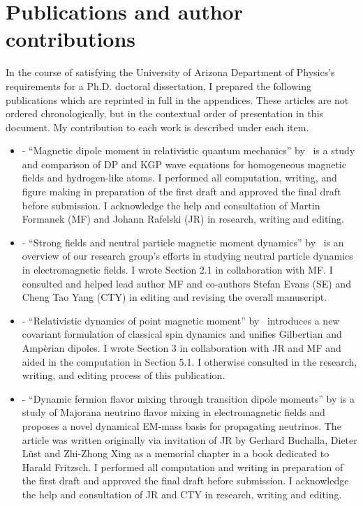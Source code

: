 \chapter*{Publications and author contributions}
\label{sec:pubs}
In the course of satisfying the University of Arizona Department of Physics's requirements for a Ph.D. doctoral dissertation, I prepared the following publications which are reprinted in full in the appendices. These articles are not ordered chronologically, but in the contextual order of presentation in this document. My contribution to each work is described under each item.
\begin{itemize}
    \item {} - ``Magnetic dipole moment in relativistic quantum mechanics'' by~\citet*{Steinmetz:2018ryf} is a study and comparison of DP and KGP wave equations for homogeneous magnetic fields and hydrogen-like atoms. I performed all computation, writing, and figure making in preparation of the first draft and approved the final draft before submission. I acknowledge the help and consultation of Martin Formanek (MF) and Johann Rafelski (JR) in research, writing and editing.
    \item {} - ``Strong fields and neutral particle magnetic moment dynamics'' by~\citet*{Formanek:2017mbv} is an overview of our research group's efforts in studying neutral particle dynamics in electromagnetic fields. I wrote Section 2.1 in collaboration with MF. I consulted and helped lead author MF and co-authors Stefan Evans (SE) and Cheng Tao Yang (CTY) in editing and revising the overall manuscript.
    \item {} - ``Relativistic dynamics of point magnetic moment'' by~\citet*{Rafelski:2017hce} introduces a new covariant formulation of classical spin dynamics and unifies Gilbertian and Amp{\`e}rian dipoles. I wrote Section 3 in collaboration with JR and MF and aided in the computation in Section 5.1. I otherwise consulted in the research, writing, and editing process of this publication.
    \item {} - ``Dynamic fermion flavor mixing through transition dipole moments'' by \citet*{Rafelski:2023zgp} is a study of Majorana neutrino flavor mixing in electromagnetic fields and proposes a novel dynamical EM-mass basis for propagating neutrinos. The article was written originally via invitation of JR by Gerhard Buchalla, Dieter L\"ust and Zhi-Zhong Xing as a memorial chapter in a book dedicated to Harald Fritzsch. I performed all computation and writing in preparation of the first draft and approved the final draft before submission. I acknowledge the help and consultation of JR and CTY in research, writing and editing.

\end{itemize}
